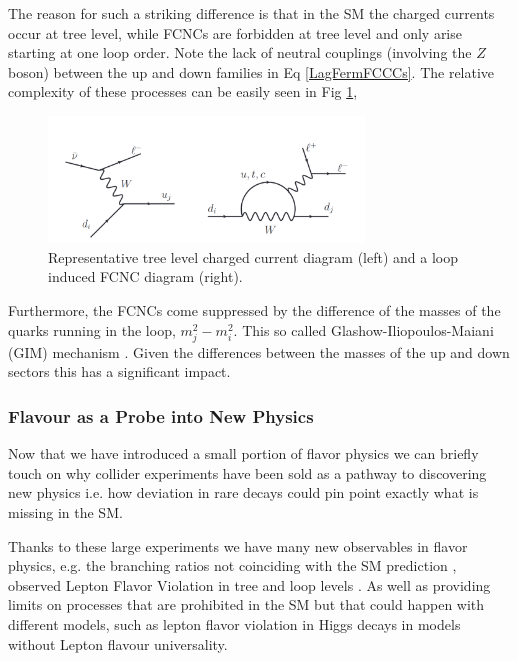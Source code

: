 \documentclass[10pt]{book}
\renewcommand{\(}{\left(}
\renewcommand{\)}{\right)}
\renewcommand{\[}{\left[}
\renewcommand{\]}{\right]}
\begin{document}
\setlength{\tabcolsep}{6pt} %
\renewcommand{\arraystretch}{1} %

The reason for such a striking difference is that in the SM the charged currents occur at tree level, while FCNCs are forbidden at tree level and only arise starting at one loop order. Note the lack of neutral couplings (involving the $Z$ boson) between the up and down families in Eq \ref{LagFermFCCCs}. The relative complexity of these processes can be easily seen in Fig \ref{fig:Flavour_D_1},
%
\begin{figure}[H]
	\centering
	\includegraphics[width=0.75\textwidth]{Stolen.png}
	\caption{Representative tree level charged current diagram (left) and a loop induced FCNC diagram (right).}
	\label{fig:Flavour_D_1}
\end{figure}
%
%
Furthermore, the FCNCs come suppressed by the difference of the masses of the quarks running in the loop, $m^2_j-m^2_i$. This so called Glashow-Iliopoulos-Maiani (GIM) mechanism \cite{glashow1970weak}. Given the differences between the masses of the up and down sectors this has a significant impact. 
%

\subsubsection{Flavour as a Probe into New Physics}

Now that we have introduced a small portion of flavor physics we can briefly touch on why collider experiments have been sold as a pathway to discovering new physics i.e. how deviation in rare decays could pin point exactly what is missing in the SM. 

Thanks to these large experiments we have many new observables in flavor physics, e.g. the branching ratios not coinciding with the SM prediction \cite{CasteloBranco2014}, observed Lepton Flavor Violation in tree and loop levels \cite{Graverini2019}.
%
As well as providing limits on processes that are prohibited in the SM but that could happen with different models, such as lepton flavor violation in Higgs decays \cite{Sirunyan_2018} in models without Lepton flavour universality. 
%
%
\end{document}
